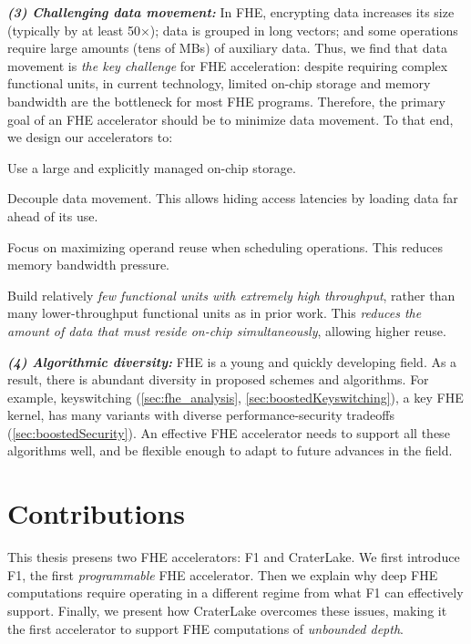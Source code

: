 \noindent \textbf{\emph{(3) Challenging data movement:}}
In FHE, encrypting data increases its size (typically by at least 50$\times$);
data is grouped in long vectors; and some operations require large amounts
(tens of MBs) of auxiliary data. Thus, we find that data movement is \emph{the
key challenge} for FHE acceleration: despite requiring complex functional
units, in current technology, limited on-chip storage and memory bandwidth are
the bottleneck for most FHE programs. Therefore, the primary goal of an FHE
accelerator should be to minimize data movement. To that end, we design our
accelerators to:
\begin{compactenum}
\item Use a large and explicitly managed on-chip storage.
\item Decouple data movement. This allows hiding access latencies by
    loading data far ahead of its use.
\item Focus on maximizing operand reuse when scheduling operations. This reduces
    memory bandwidth pressure.
\item Build relatively \emph{few functional units with extremely high
    throughput}, rather than many lower-throughput functional units as in prior
    work. This \emph{reduces the amount of data that must reside on-chip
    simultaneously}, allowing higher reuse.
\end{compactenum}

\noindent \textbf{\emph{(4) Algorithmic diversity:}}
FHE is a young and quickly developing field. As a result, there is abundant
diversity in proposed schemes and algorithms. For example, keyswitching
(\autoref{sec:fhe_analysis}, \autoref{sec:boostedKeyswitching}), a key FHE
kernel, has many variants with diverse performance-security tradeoffs
(\autoref{sec:boostedSecurity}). An effective FHE accelerator needs to support
all these algorithms well, and be flexible enough to adapt to future advances
in the field.

\section{Contributions}
\label{sec:contributions}

This thesis presens two FHE accelerators: F1 and CraterLake. We first introduce
F1, the first \emph{programmable} FHE accelerator. Then we explain why deep FHE
computations require operating in a different regime from what F1 can
effectively support. Finally, we present how CraterLake overcomes these issues,
making it the first accelerator to support FHE computations of \emph{unbounded
depth}.

